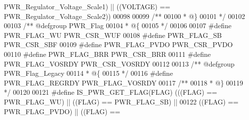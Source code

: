 \begin{DoxyCode}
      PWR_Regulator_Voltage_Scale1\textcolor{preprocessor}{)} \textcolor{preprocessor}{||} \textcolor{preprocessor}{(}\textcolor{preprocessor}{(}\textcolor{preprocessor}{VOLTAGE}\textcolor{preprocessor}{)} \textcolor{preprocessor}{==} PWR_Regulator_Voltage_Scale2\textcolor{preprocessor}{)}\textcolor{preprocessor}{)}
00098 
00099 \textcolor{comment}{/**}
00100 \textcolor{comment}{  * @\}}
00101 \textcolor{comment}{  */}
00102 
00103 \textcolor{comment}{/** @defgroup PWR\_Flag }
00104 \textcolor{comment}{  * @\{}
00105 \textcolor{comment}{  */}
00106 
00107 \textcolor{preprocessor}{#}\textcolor{preprocessor}{define} \textcolor{preprocessor}{PWR\_FLAG\_WU}                     PWR_CSR_WUF
00108 \textcolor{preprocessor}{#}\textcolor{preprocessor}{define} \textcolor{preprocessor}{PWR\_FLAG\_SB}                     PWR_CSR_SBF
00109 \textcolor{preprocessor}{#}\textcolor{preprocessor}{define} \textcolor{preprocessor}{PWR\_FLAG\_PVDO}                   PWR_CSR_PVDO
00110 \textcolor{preprocessor}{#}\textcolor{preprocessor}{define} \textcolor{preprocessor}{PWR\_FLAG\_BRR}                    PWR_CSR_BRR
00111 \textcolor{preprocessor}{#}\textcolor{preprocessor}{define} \textcolor{preprocessor}{PWR\_FLAG\_VOSRDY}                 PWR_CSR_VOSRDY
00112 
00113 \textcolor{comment}{/** @defgroup PWR\_Flag\_Legacy }
00114 \textcolor{comment}{  * @\{}
00115 \textcolor{comment}{  */}
00116 \textcolor{preprocessor}{#}\textcolor{preprocessor}{define} \textcolor{preprocessor}{PWR\_FLAG\_REGRDY}                  PWR_FLAG_VOSRDY
00117 \textcolor{comment}{/**}
00118 \textcolor{comment}{  * @\}}
00119 \textcolor{comment}{  */}
00120 
00121 \textcolor{preprocessor}{#}\textcolor{preprocessor}{define} \textcolor{preprocessor}{IS\_PWR\_GET\_FLAG}\textcolor{preprocessor}{(}\textcolor{preprocessor}{FLAG}\textcolor{preprocessor}{)} \textcolor{preprocessor}{(}\textcolor{preprocessor}{(}\textcolor{preprocessor}{(}\textcolor{preprocessor}{FLAG}\textcolor{preprocessor}{)} \textcolor{preprocessor}{==} PWR_FLAG_WU\textcolor{preprocessor}{)} \textcolor{preprocessor}{||} \textcolor{preprocessor}{(}\textcolor{preprocessor}{(}\textcolor{preprocessor}{FLAG}\textcolor{preprocessor}{)} \textcolor{preprocessor}{==} 
      PWR_FLAG_SB\textcolor{preprocessor}{)} \textcolor{preprocessor}{||}
00122                                \textcolor{preprocessor}{(}\textcolor{preprocessor}{(}\textcolor{preprocessor}{FLAG}\textcolor{preprocessor}{)} \textcolor{preprocessor}{==} PWR_FLAG_PVDO\textcolor{preprocessor}{)} \textcolor{preprocessor}{||} \textcolor{preprocessor}{(}\textcolor{preprocessor}{(}\textcolor{preprocessor}{FLAG}\textcolor{preprocessor}{)} \textcolor{preprocessor}{==} 

\end{DoxyCode}
